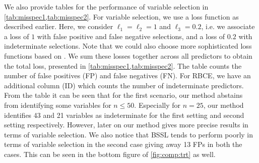 \documentclass[preprint,12pt]{elsarticle}
\begin{document}
We also provide tables for the performance of variable selection in \cref{tab:misspec1,tab:misspec2}.
For variable selection, we use a loss function as described earlier.
Here, we consider
$\ell_1=\ell_2=1$ and $\ell_3= 0.2$,
i.e. we associate a loss of $1$ with false positive and false negative selections,
and a loss of $0.2$ with indeterminate selections.
Note that we could also choose more 
sophisticated loss functions based on \citep{ZAFFALON20121282}.
We sum these losses together across all predictors
to obtain the total loss, presented in \cref{tab:misspec1,tab:misspec2}.
The table counts the number of
false positives (FP) and false negatives (FN). For RBCE, we have an
additional column (ID)
which counts the number of indeterminate predictors.
From the table it can be seen that for the first scenario, our method
abstains from identifying some variables for 
$n \le 50$. Especially for $n=25$, our method identifies 43 and 21 variables as indeterminate
for the first setting and second setting respectively. However,
later on our method gives more precise results in terms of variable
selection. We also notice that BSSL tends to perform poorly
in terms of variable selection in the second case giving away 13 FPs in both the cases. This can be seen in the bottom figure of \cref{fig:comp:trt}
as well.
\end{document}
